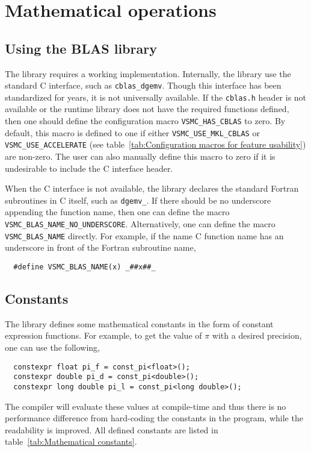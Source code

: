 \chapter{Mathematical operations}
\label{chap:Mathemtical operations}

\section{Using the BLAS library}
\label{sec:Using the BLAS library}

The library requires a working \blas implementation. Internally, the library
use the standard C interface, such as \verb|cblas_dgemv|. Though this interface
has been standardized for years, it is not universally available. If the
\verb|cblas.h| header is not available or the runtime library does not have the
required functions defined, then one should define the configuration macro
\verb|VSMC_HAS_CBLAS| to zero. By default, this macro is defined to one if
either \verb|VSMC_USE_MKL_CBLAS| or \verb|VSMC_USE_ACCELERATE| (see
table~\ref{tab:Configuration macros for feature usability}) are non-zero. The
user can also manually define this macro to zero if it is undesirable to
include the C interface header.

When the C interface is not available, the library declares the standard
Fortran subroutines in C itself, such as \verb|dgemv_|. If there should be no
underscore appending the function name, then one can define the macro
\verb|VSMC_BLAS_NAME_NO_UNDERSCORE|. Alternatively, one can define the macro
\verb|VSMC_BLAS_NAME| directly. For example, if the name C function name has
an underscore in front of the Fortran subroutine name,
\begin{Verbatim}
  #define VSMC_BLAS_NAME(x) _##x##_
\end{Verbatim}

\section{Constants}
\label{sec:Constants}

The library defines some mathematical constants in the form of constant
expression functions. For example, to get the value of $\pi$ with a desired
precision, one can use the following,
\begin{Verbatim}
  constexpr float pi_f = const_pi<float>();
  constexpr double pi_d = const_pi<double>();
  constexpr long double pi_l = const_pi<long double>();
\end{Verbatim}
The compiler will evaluate these values at compile-time and thus there is no
performance difference from hard-coding the constants in the program, while the
readability is improved. All defined constants are listed in
table~\ref{tab:Mathematical constants}.

